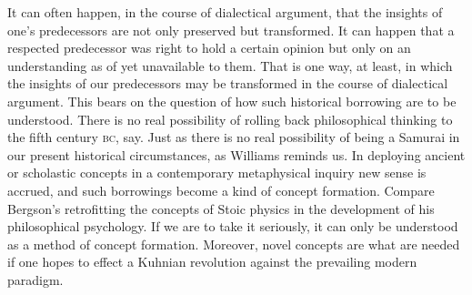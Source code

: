 It can often happen, in the course of dialectical argument, that the insights of one's predecessors are not only preserved but transformed. It can happen that a respected predecessor was right to hold a certain opinion but only on an understanding as of yet unavailable to them. That is one way, at least, in which the insights of our predecessors may be transformed in the course of dialectical argument. This bears on the question of how such historical borrowing are to be understood. There is no real possibility of rolling back philosophical thinking to the fifth century \textsc{bc}, say. Just as there is no real possibility of being a Samurai in our present historical circumstances, as Williams reminds us. In deploying ancient or scholastic concepts in a contemporary metaphysical inquiry new sense is accrued, and such borrowings become a kind of concept formation. Compare Bergson's retrofitting the concepts of Stoic physics in the development of his philosophical psychology. If we are to take it seriously, it can only be understood as a method of concept formation. Moreover, novel concepts are what are needed if one hopes to effect a Kuhnian revolution against the prevailing modern paradigm.






